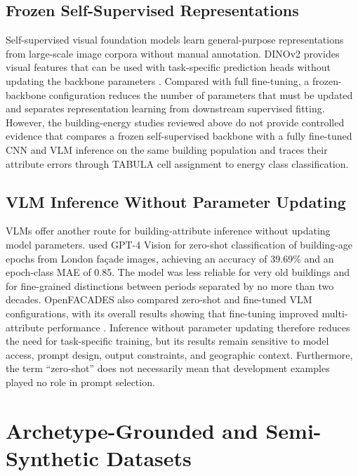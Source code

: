 \subsection{Frozen Self-Supervised Representations}
\label{sec:frozen_ssl_representations}

Self-supervised visual foundation models learn general-purpose representations from large-scale image corpora without manual annotation.
DINOv2 provides visual features that can be used with task-specific prediction heads without updating the backbone parameters \parencite{oquab2023}.
Compared with full fine-tuning, a frozen-backbone configuration reduces the number of parameters that must be updated and separates representation learning from downstream supervised fitting.
However, the building-energy studies reviewed above do not provide controlled evidence that compares a frozen self-supervised backbone with a fully fine-tuned \ac{CNN} and \ac{VLM} inference on the same building population and traces their attribute errors through TABULA cell assignment to energy class classification.

\subsection{VLM Inference Without Parameter Updating}
\label{sec:vlm_inference}

\Acp{VLM} offer another route for building-attribute inference without updating model parameters.
\textcite{zeng2024} used GPT-4 Vision for zero-shot classification of building-age epochs from London façade images, achieving an accuracy of 39.69\% and an epoch-class MAE of 0.85.
The model was less reliable for very old buildings and for fine-grained distinctions between periods separated by no more than two decades.
OpenFACADES also compared zero-shot and fine-tuned \ac{VLM} configurations, with its overall results showing that fine-tuning improved multi-attribute performance \parencite{liang2025}.
Inference without parameter updating therefore reduces the need for task-specific training, but its results remain sensitive to model access, prompt design, output constraints, and geographic context.
Furthermore, the term \enquote{zero-shot} does not necessarily mean that development examples played no role in prompt selection.

\section{Archetype-Grounded and Semi-Synthetic Datasets}
\label{sec:archetype_semi_synthetic_datasets}


